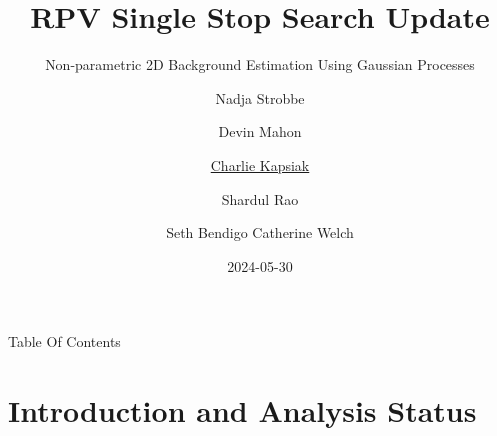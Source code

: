 \documentclass[10pt]{beamer}
\author[Charlie Kapsiak (UMN Single Stop Group) ]{
  Nadja Strobbe\inst{1} \and
  Devin Mahon\inst{1} \and
  \underline{Charlie Kapsiak}\inst{1} \and
  Shardul Rao\inst{1} \and
  Seth Bendigo\inst{1}
  Catherine Welch\inst{1}
}
\institute{\inst{1}University of Minnesota}
\title[Single Stop Update]{RPV Single Stop Search Update}
\subtitle{Non-parametric 2D Background Estimation Using Gaussian Processes}
\date{2024-05-30}
\begin{document}
\begin{frame}
  \maketitle
\end{frame}

\begin{frame}{Table Of Contents}
  \tableofcontents
\end{frame}

%   
%     
%   
%   
%   
%   

\section[Intro]{Introduction and Analysis Status}
\end{document}
